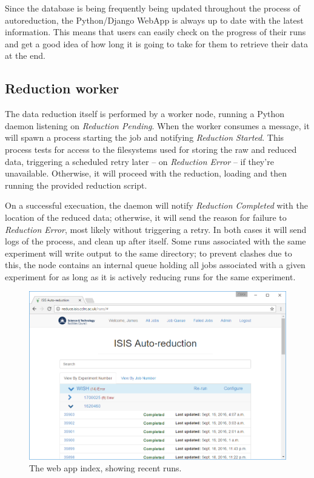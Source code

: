 \documentclass[twocolumn]{article}
\begin{document}
Since the database is being frequently being updated throughout the process of autoreduction,
the Python/Django\cite{django} WebApp is always up to date with the latest information.
This means that users can easily check on the progress of their runs and get a good idea of 
how long it is going to take for them to retrieve their data at the end.

\subsection{Reduction worker}\label{reduction-worker}

The data reduction itself is performed by a worker node, running a
Python daemon listening on \emph{Reduction Pending}. When the worker
consumes a message, it will spawn a process starting the job and
notifying \emph{Reduction Started}. This process tests for access to the
filesystems used for storing the raw and reduced data, triggering a
scheduled retry later -- on \emph{Reduction Error} -- if they're
unavailable. Otherwise, it will proceed with the reduction, loading and
then running the provided reduction script.

On a successful execuation, the daemon will notify \emph{Reduction Completed} with
the location of the reduced data; otherwise, it will send the reason for
failure to \emph{Reduction Error}, most likely without triggering a
retry. In both cases it will send logs of the process, and clean up
after itself. Some runs associated with the same experiment will write
output to the same directory; to prevent clashes due to this, the node
contains an internal queue holding all jobs associated with a given
experiment for as long as it is actively reducing runs for the
same experiment.


\begin{figure}
\centering\includegraphics[width=0.8\linewidth]{index.png}
\caption{The web app index, showing recent runs.}
\end{figure}
\end{document}
